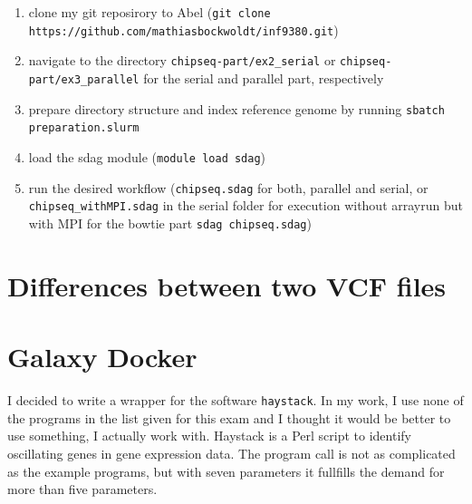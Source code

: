 \documentclass[paper=a4, 12pt]{scrartcl}
\begin{document}
\begin{enumerate}
\item clone my git reposirory to Abel (\texttt{git clone https://github.com/mathiasbockwoldt/inf9380.git})
\item navigate to the directory \texttt{chipseq-part/ex2\_serial} or \texttt{chipseq-part/ex3\_parallel} for the serial and parallel part, respectively
\item prepare directory structure and index reference genome by running \texttt{sbatch preparation.slurm}
\item load the sdag module (\texttt{module load sdag})
\item run the desired workflow (\texttt{chipseq.sdag} for both, parallel and serial, or \texttt{chipseq\_withMPI.sdag} in the serial folder for execution without arrayrun but with MPI for the bowtie part \texttt{sdag chipseq.sdag})
\end{enumerate}


\section{Differences between two VCF files}



\section{Galaxy Docker}

I decided to write a wrapper for the software \texttt{haystack}. In my work, I use none of the programs in the list given for this exam and I thought it would be better to use something, I actually work with. Haystack is a Perl script to identify oscillating genes in gene expression data. The program call is not as complicated as the example programs, but with seven parameters it fullfills the demand for more than five parameters.
\end{document}
